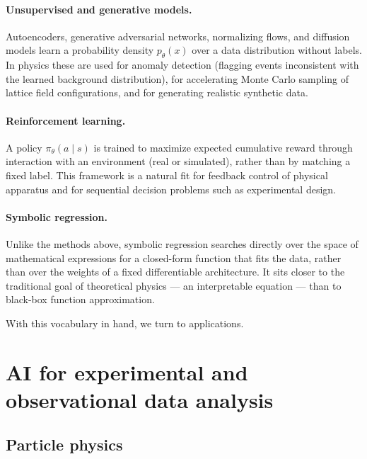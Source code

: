 \documentclass[11pt]{article}
\begin{document}
\paragraph{Unsupervised and generative models.} Autoencoders, generative adversarial networks, normalizing flows, and diffusion models learn a probability density $p_\theta(x)$ over a data distribution without labels. In physics these are used for anomaly detection (flagging events inconsistent with the learned background distribution), for accelerating Monte Carlo sampling of lattice field configurations, and for generating realistic synthetic data.

\paragraph{Reinforcement learning.} A policy $\pi_\theta(a\mid s)$ is trained to maximize expected cumulative reward through interaction with an environment (real or simulated), rather than by matching a fixed label. This framework is a natural fit for feedback control of physical apparatus and for sequential decision problems such as experimental design.

\paragraph{Symbolic regression.} Unlike the methods above, symbolic regression searches directly over the space of mathematical expressions for a closed-form function that fits the data, rather than over the weights of a fixed differentiable architecture. It sits closer to the traditional goal of theoretical physics --- an interpretable equation --- than to black-box function approximation.

With this vocabulary in hand, we turn to applications.

\section{AI for experimental and observational data analysis}
\label{sec:data}

\subsection{Particle physics}
\end{document}
